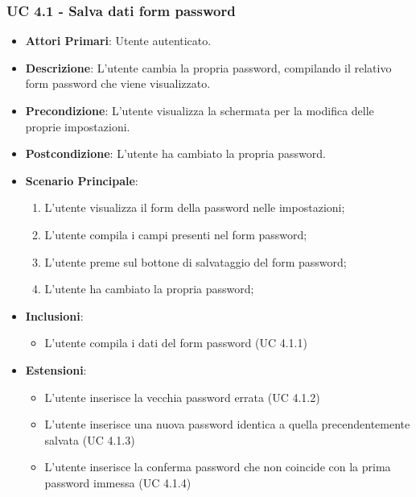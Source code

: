 			\subsubsection{UC 4.1 - Salva dati form password}
			\begin{itemize}
				\item \textbf{Attori Primari}: Utente autenticato.
				\item \textbf{Descrizione}: L'utente cambia la propria password, compilando il relativo form password che viene visualizzato.
				\item \textbf{Precondizione}: L'utente visualizza la schermata per la modifica delle proprie impostazioni.
				\item \textbf{Postcondizione}: L'utente ha cambiato la propria password.
				\item \textbf{Scenario Principale}:
				\begin{enumerate}
					\item L'utente visualizza il form della password nelle impostazioni;
					\item L'utente compila i campi presenti nel form password;
					\item L'utente preme sul bottone di salvataggio del form password;
					\item L'utente ha cambiato la propria password;
				\end{enumerate}	
				\item \textbf{Inclusioni}:
					\begin{itemize}
						\item L'utente compila i dati del form password (UC 4.1.1)
					\end{itemize}
				\item \textbf{Estensioni}:
					\begin{itemize}
						\item L'utente inserisce la vecchia password errata (UC 4.1.2)
						\item L'utente inserisce una nuova password identica a quella precendentemente salvata (UC 4.1.3)
						\item L'utente inserisce la conferma password che non coincide con la prima password immessa (UC 4.1.4)
					\end{itemize}
			\end{itemize}

